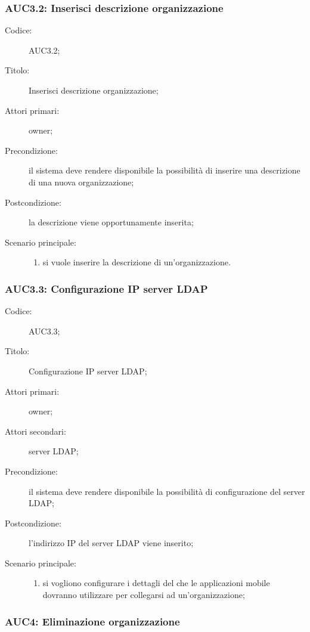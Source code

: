 \documentclass[../../../analisi-dei-requisiti.tex]{subfiles}
\begin{document}
\subsubsection{AUC3.2: Inserisci descrizione organizzazione}%
\label{subs:AUC3.2}
\begin{description}
  \item[Codice:] AUC3.2;
  \item[Titolo:] Inserisci descrizione organizzazione;
  \item[Attori primari:] owner;
  \item[Precondizione:] il sistema deve rendere disponibile la possibilità di inserire una descrizione di una nuova organizzazione;
  \item[Postcondizione:] la descrizione viene opportunamente inserita;
  \item[Scenario principale:]
        \begin{enumerate}
          \item si vuole inserire la descrizione di un'organizzazione.
        \end{enumerate}
\end{description}

\subsubsection{AUC3.3: Configurazione IP server LDAP}%
\label{subs:AUC3.3}
\begin{description}
  \item[Codice:] AUC3.3;
  \item[Titolo:] Configurazione IP server LDAP\@;
  \item[Attori primari:] owner;
  \item[Attori secondari:] server LDAP\@;
  \item[Precondizione:] il sistema deve rendere disponibile la possibilità di configurazione del server LDAP\@;
  \item[Postcondizione:] l'indirizzo IP del server LDAP viene inserito;
  \item[Scenario principale:]
        \begin{enumerate}
          \item si vogliono configurare i dettagli del  che le applicazioni mobile dovranno utilizzare per collegarsi ad un'organizzazione;
        \end{enumerate}
\end{description}

\subsubsection{AUC4: Eliminazione organizzazione}%
\label{subs:AUC4}
\end{document}
